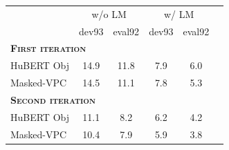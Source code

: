 \begin{table}[t]
\centering
{}
\label{tab:ctc-iter2}
\footnotesize
\begin{tabular}{lccccc}
  \toprule
  & \multicolumn{2}{c}{w/o LM} & \multicolumn{2}{c}{w/ LM}\\
  &dev93 &eval92 &dev93 &eval92\\[1pt]
  \midrule
  \multicolumn{3}{l}{\textbf{\textsc{First iteration}}} &\\[1pt]
  HuBERT Obj                  &14.9 &11.8 &7.9 &6.0\\
  Masked-VPC                &14.5 &11.1 &7.8 &5.3 \\
  \midrule
  \multicolumn{3}{l}{\textbf{\textsc{Second iteration}}} &\\[1pt]
  HuBERT Obj                &11.1 &8.2  &6.2 &4.2 \\
  Masked-VPC                &10.4 &7.9  &5.9 &3.8 \\
  \bottomrule
\end{tabular}
\end{table}
